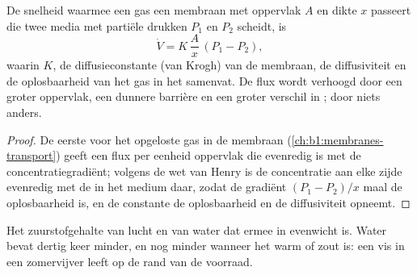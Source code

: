 \begin{theorem}\label{thm:b1:gas-exchange:fick}
De snelheid waarmee een gas een membraan met oppervlak $A$ en dikte $x$ passeert
die twee media met partiële drukken $P_1$ en $P_2$ scheidt, is
\[
\dot V = K\,\frac{A}{x}\,(P_1 - P_2),
\]
waarin $K$, de diffusieconstante (van Krogh) van de membraan, de diffusiviteit en
de oplosbaarheid van het gas in het  samenvat. De flux wordt verhoogd door
een groter oppervlak, een dunnere barrière en een groter verschil in ;
door niets anders.
\end{theorem}
\begin{proof}
De eerste  voor het opgeloste gas in de membraan
(\cref{ch:b1:membranes-transport}) geeft een flux per eenheid oppervlak die
evenredig is met de concentratiegradiënt; volgens de wet van Henry is de
concentratie aan elke zijde evenredig met de  in het medium daar,
zodat de gradiënt $(P_1 - P_2)/x$ maal de oplosbaarheid is, en de constante de
oplosbaarheid en de diffusiviteit opneemt.
\end{proof}

\begin{omfigure}

{\small Het zuurstofgehalte van lucht en van water dat ermee in evenwicht is. Water
bevat dertig keer minder, en nog minder wanneer het warm of zout is: een vis in een
zomervijver leeft op de rand van de voorraad.}
\end{omfigure}

